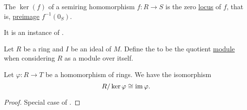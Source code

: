 \begin{definition}\label{def:semiring_kernel}
  The  \( \ker(f) \) of a semiring homomorphism \( f: R \to S \) is the zero \hyperref[def:zero_locus]{locus} of \( f \), that is, \hyperref[def:function/preimage]{preimage} \( f^{-1}(0_S) \).

  It is an instance of .
\end{definition}

\begin{definition}\label{def:quotient_semiring}
  Let \( R \) be a ring and \( I \) be an ideal of \( M \). Define the  to be the quotient \hyperref[def:quotient_left_module]{module} when considering \( R \) as a module over itself.
\end{definition}

\begin{theorem}\label{thm:homomorphism_theorem_for_rings}
  Let \( \varphi: R \to T \) be a homomorphism of rings. We have the isomorphism
  \begin{equation*}
    R / \ker \varphi \cong \operatorname{im} \varphi.
  \end{equation*}
\end{theorem}
\begin{proof}
  Special case of .
\end{proof}

